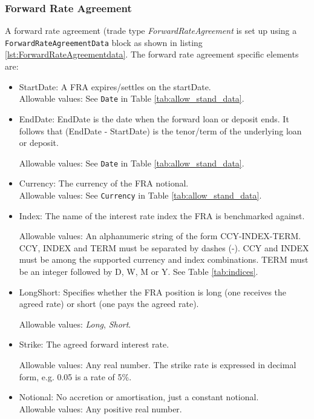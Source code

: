 \subsubsection{Forward Rate Agreement}

A forward rate agreement (trade type \emph{ForwardRateAgreement} is set up using a \\
{\tt ForwardRateAgreementData} block as shown in listing \ref{lst:ForwardRateAgreementdata}. The forward rate agreement specific elements
are:

\begin{itemize}
\item StartDate: A FRA expires/settles on the startDate. \\

Allowable values:  See \lstinline!Date! in Table \ref{tab:allow_stand_data}.

\item EndDate: EndDate is the date when the forward loan or deposit ends. It follows that (EndDate - StartDate) is the tenor/term of the underlying loan or deposit.

Allowable values:  See \lstinline!Date! in Table \ref{tab:allow_stand_data}.
\item Currency: The currency of the FRA notional. \\

Allowable values:  See \lstinline!Currency! in Table \ref{tab:allow_stand_data}.	
\item Index: The name of the interest rate index the FRA is benchmarked against.

  Allowable values: An alphanumeric string of the form CCY-INDEX-TERM. CCY, INDEX and TERM must be separated by dashes (-). CCY and INDEX must be among the supported currency and index combinations. TERM must be an integer followed by D, W,
  M or Y. See Table \ref{tab:indices}.
  
\item LongShort: Specifies whether the FRA position is long (one receives the agreed rate) or short (one pays the agreed rate).

Allowable values: \emph{Long}, \emph{Short}.
\item Strike: The agreed forward interest rate.

Allowable values: Any  real number. The strike rate is
  expressed in decimal form, e.g. 0.05 is a rate of 5\%.
\item Notional: No accretion or amortisation, just a constant notional. \\
Allowable values:  Any positive real number.
\end{itemize}


